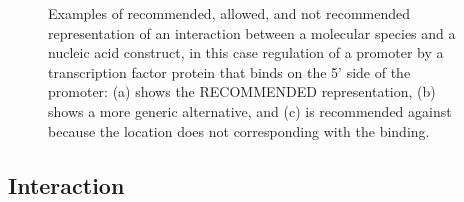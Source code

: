 \begin{enumerate}
	\begin{figure}[h!]
	\centering
	\caption{Examples of recommended, allowed, and not recommended representation of an interaction between a molecular species and a nucleic acid construct, in this case regulation of a promoter by a transcription factor protein that binds on the 5' side of the promoter: 
	(a) shows the RECOMMENDED representation, (b) shows a more generic alternative, and (c) is recommended against because the location does not corresponding with the binding.}
	\label{exa:3}
	\end{figure}

\end{enumerate}


\subsection{Interaction}

